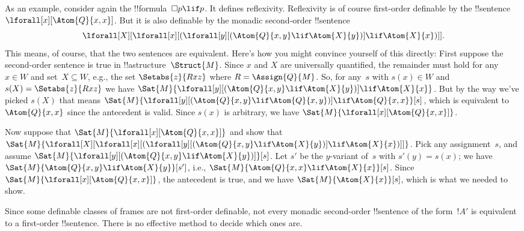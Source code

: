 \documentclass[../../../include/open-logic-section]{subfiles}
\begin{document}
As an example, consider again the !!{formula}~$\Box p \lif p$. It
defines reflexivity. Reflexivity is of course first-order definable by
the !!{sentence}~$\lforall[x][\Atom{Q}{x,x}]$. But it is also definable by the
monadic second-order !!{sentence}
\[
\lforall[X][\lforall[x][(\lforall[y][(\Atom{Q}{x,y} \lif \Atom{X}{y})]
    \lif \Atom{X}{x})]].
\]
This means, of course, that the two sentences are equivalent. Here's
how you might convince yourself of this directly: First suppose the
second-order sentence is true in !!a{structure}~$\Struct{M}$. Since $x$ and $X$
are universally quantified, the remainder must hold for any $x \in W$
and set~$X \subseteq W$, e.g., the set $\Setabs{z}{Rxz}$ where $R =
\Assign{Q}{M}$. So, for any~$s$ with $s(x) \in W$ and $s(X) =
\Setabs{z}{Rxz}$ we have $\Sat{M}{\lforall[y][(\Atom{Q}{x,y} \lif
    \Atom{X}{y})] \lif \Atom{X}{x}}$. But by the way we've picked
$s(X)$ that means $\Sat{M}{\lforall[y][(\Atom{Q}{x,y} \lif
    \Atom{Q}{x,y})] \lif \Atom{Q}{x,x}}[s]$, which is equivalent to
$\Atom{Q}{x,x}$ since the antecedent is valid. Since $s(x)$ is
arbitrary, we have $\Sat{M}{\lforall[x][\Atom{Q}{x,x}]}$.

Now suppose that $\Sat{M}{\lforall[x][\Atom{Q}{x,x}]}$ and show that
$\Sat{M}{\lforall[X][\lforall[x][(\lforall[y][(\Atom{Q}{x,y} \lif
        \Atom{X}{y})] \lif \Atom{X}{x})]]}$. Pick any assignment~$s$,
and assume $\Sat{M}{\lforall[y][(\Atom{Q}{x,y} \lif
    \Atom{X}{y})]}[s]$. Let $s'$ be the $y$-variant of~$s$ with $s'(y)
= s(x)$; we have $\Sat{M}{\Atom{Q}{x,y} \lif \Atom{X}{y}}[s']$, i.e.,
$\Sat{M}{\Atom{Q}{x,x} \lif \Atom{X}{x}}[s]$. Since
$\Sat{M}{\lforall[x][\Atom{Q}{x,x}]}$, the antecedent is true, and we
have $\Sat{M}{\Atom{X}{x}}[s]$, which is what we needed to show.

Since some definable classes of frames are not first-order definable,
not every monadic second-order !!{sentence} of the form~$!A'$ is
equivalent to a first-order !!{sentence}. There is no effective method
to decide which ones are.
\end{document}
